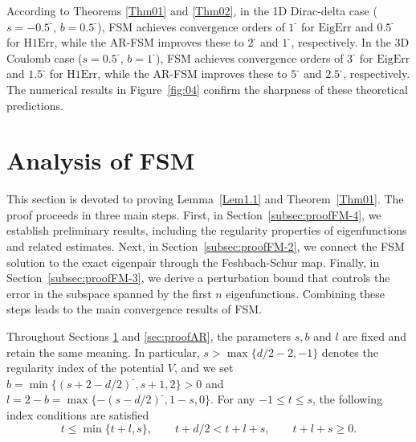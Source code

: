 \documentclass{sn-jnl}%
\newcommand{\m}{\textbf{-}}
\numberwithin{equation}{section}
\theoremstyle{thmstyleone}%
\theoremstyle{thmstyletwo}%
\theoremstyle{thmstylethree}%
\begin{document}
According to Theorems \ref{Thm01} and \ref{Thm02}, in the 1D Dirac-delta case ($s=-0.5^{\m}$, $b=0.5^{\m}$), FSM achieves convergence orders of $1^{\m}$ for $\mathrm{EigErr}$ and $0.5^{\m}$ for $\mathrm{H1Err}$, while the AR-FSM improves these to $2^{\m}$ and $1^{\m}$, respectively. 
In the 3D Coulomb case ($s=0.5^{\m}$, $b=1^{\m}$),  FSM achieves convergence orders of $3^{\m}$ for $\mathrm{EigErr}$ and $1.5^{\m}$ for $\mathrm{H1Err}$, while the AR-FSM improves these to $5^{\m}$ and $2.5^{\m}$, respectively. 
The numerical results in Figure~\ref{fig:04} confirm the sharpness of these theoretical predictions.

\section{Analysis of FSM}\label{sec:proofFM}

This section is devoted to proving Lemma~\ref{Lem1.1} and Theorem~\ref{Thm01}.  
The proof proceeds in three main steps. First, in Section~\ref{subsec:proofFM-4}, we establish preliminary results, including the regularity properties of eigenfunctions and related estimates.  
Next, in Section~\ref{subsec:proofFM-2}, we connect the FSM solution to the exact eigenpair through the Feshbach-Schur map.
Finally, in Section~\ref{subsec:proofFM-3}, we derive a perturbation bound that controls the error in the subspace spanned by the first $n$ eigenfunctions.  Combining these steps leads to the main convergence results of FSM.

Throughout Sections \ref{sec:proofFM} and \ref{sec:proofAR}, the parameters $s, b$ and $l$ are fixed and retain the same meaning. In particular, $s>\max\{d/2-2,-1\}$ denotes the regularity index of the potential $V$, and we set $b = \min\{(s+2-d/2)^{\m}, s+1,2\}>0$ and $l=2-b=\max\{-(s-d/2)^{\m},1-s,0\}$. For any $-1 \leq t \leq s$, the following index conditions are satisfied
\begin{equation}\label{Eq-5.0-01}
    t \leq \min\{t+l, s\}, \qquad
    t + d/2 < t+l + s, \qquad
    t+l + s \geq 0.
\end{equation}
\end{document}
